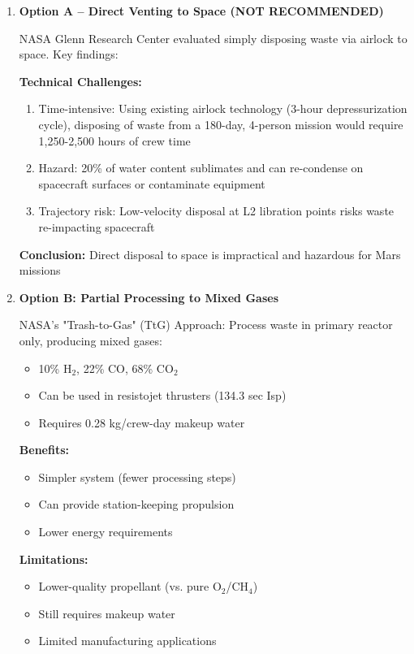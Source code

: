 \documentclass[12pt, a4paper]{article}
\begin{document}
\begin{enumerate}
    \item \textbf{Option A -- Direct Venting to Space (NOT RECOMMENDED)}
    
    NASA Glenn Research Center evaluated simply disposing waste via airlock to space. Key findings:
    
    \textbf{Technical Challenges:}
    \begin{enumerate}
        \item Time-intensive: Using existing airlock technology (3-hour depressurization cycle), disposing of waste from a 180-day, 4-person mission would require 1,250-2,500 hours of crew time
        \item Hazard: 20\% of water content sublimates and can re-condense on spacecraft surfaces or contaminate equipment
        \item Trajectory risk: Low-velocity disposal at L2 libration points risks waste re-impacting spacecraft
    \end{enumerate}
    \textbf{Conclusion:} Direct disposal to space is impractical and hazardous for Mars missions

    \item \textbf{Option B: Partial Processing to Mixed Gases}
    
    NASA's "Trash-to-Gas" (TtG) Approach: Process waste in primary reactor only, producing mixed gases:
    \begin{itemize}
        \item 10\% H$_2$, 22\% CO, 68\% CO$_2$
        \item Can be used in resistojet thrusters (134.3 sec Isp)
        \item Requires 0.28 kg/crew-day makeup water
    \end{itemize}
    
    \textbf{Benefits:}
    \begin{itemize}
        \item Simpler system (fewer processing steps)
        \item Can provide station-keeping propulsion
        \item Lower energy requirements
    \end{itemize}
    
    \textbf{Limitations:}
    \begin{itemize}
        \item Lower-quality propellant (vs. pure O$_2$/CH$_4$)
        \item Still requires makeup water
        \item Limited manufacturing applications
    \end{itemize}


\end{enumerate}
\end{document}
